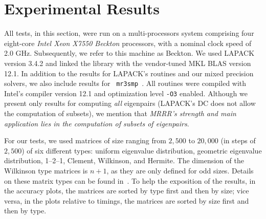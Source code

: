 \documentclass[final]{siamltex}
\begin{document}
\section{Experimental Results}
\label{sec:experiments}

All tests, in this section, were run on a multi-processors system comprising four
eight-core {\it Intel Xeon X7550 Beckton} processors, with a nominal clock
speed of 2.0 GHz. 
Subsequently, we refer to this
machine as {\sc Beckton}. We used LAPACK version
3.4.2 and linked the library with the vendor-tuned MKL BLAS version
12.1. In addition to the results for LAPACK's routines and our mixed
precision solvers, we also include results for {\tt
mr3smp}~\cite{mr3smp}. All routines were compiled with
Intel's compiler version 12.1 and optimization level {\tt -O3} enabled.
Although we present only results for computing {\it all}
eigenpairs (LAPACK's DC does not allow the computation of subsets), we
mention that {\it MRRR's strength and main application lies in the
  computation of subsets of 
eigenpairs}. 

For our tests, we used matrices of size ranging from $2{,}500$ to
$20{,}000$ (in steps of $2{,}500$) of six different types: uniform eigenvalue distribution,
geometric eigenvalue distribution, 1--2--1, Clement, Wilkinson, and Hermite. The
dimension of the Wilkinson type matrices is $n+1$, as they are
only defined for odd sizes. Details on these matrix types can be found
in~\cite{Marques:2008}. 
To help the exposition of the results, in the accuracy plots, the matrices
are sorted by type first and then by size; vice versa, in the plots relative
to timings, the matrices are sorted by size first and then by type.  
\end{document}
